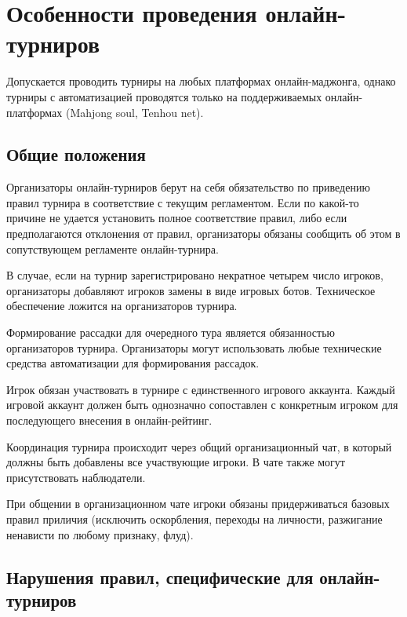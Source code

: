 \section{Особенности проведения онлайн-турниров}

Допускается проводить турниры на любых платформах онлайн-маджонга, однако турниры с автоматизацией проводятся только на поддерживаемых онлайн-платформах (Mahjong soul, Tenhou net). 

\subsection{Общие положения}

Организаторы онлайн-турниров берут на себя обязательство по приведению правил турнира в соответствие с текущим регламентом. Если по какой-то причине не удается установить полное соответствие правил, либо если предполагаются отклонения от правил, организаторы обязаны сообщить об этом в сопутствующем регламенте онлайн-турнира.

В случае, если на турнир зарегистрировано некратное четырем число игроков, организаторы добавляют игроков замены в виде игровых ботов. Техническое обеспечение ложится на организаторов турнира.

Формирование рассадки для очередного тура является обязанностью организаторов турнира. Организаторы могут использовать любые технические средства автоматизации для формирования рассадок.

Игрок обязан участвовать в турнире с единственного игрового аккаунта. Каждый игровой аккаунт должен быть однозначно сопоставлен с конкретным игроком для последующего внесения в онлайн-рейтинг.

Координация турнира происходит через общий организационный чат, в который должны быть добавлены все участвующие игроки. В чате также могут присутствовать наблюдатели.

При общении в организационном чате игроки обязаны придерживаться базовых правил приличия (исключить оскорбления, переходы на личности, разжигание ненависти по любому признаку, флуд).

\subsection{Нарушения правил, специфические для онлайн-турниров}


